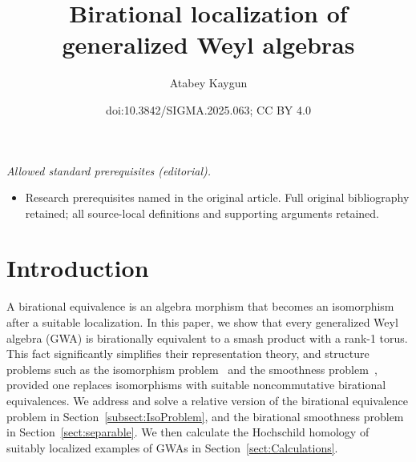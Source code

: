 \documentclass[10pt,a4paper]{amsart}
\title{Birational localization of generalized Weyl algebras}
\author{Atabey Kaygun}
\date{doi:10.3842/SIGMA.2025.063; CC BY 4.0}
\numberwithin{equation}{section}
\begin{document}
\maketitle
\noindent\textit{Allowed standard prerequisites (editorial).}\begin{itemize}
\item Research prerequisites named in the original article. Full original bibliography retained; all source-local definitions and supporting arguments retained.
\end{itemize}\medskip
\section{Introduction}

A birational equivalence is an algebra morphism that becomes an isomorphism after a suitable
localization. In this paper, we show that every generalized Weyl algebra (GWA) is birationally
equivalent to a smash product with a rank-1 torus. This fact significantly simplifies their
representation theory, and structure problems such as the isomorphism
problem~\cite{BavulaJordan:IsoProblem,Hodges:NCDeformations, RichardSolotar:IsoProblem,
 AlvarezVivaz:IsomorphismsOfQGWAs, Tang:IsoProblem} and the smoothness
problem~\cite{Bavula:GlobalDim, Hodges:NCDeformations,
 Liu:HomologicalSmoothnessI,Liu:HomologicalSmoothnessII, SolotarAlvarezVivas:QuantumGeneralizedWeyl}, provided one replaces isomorphisms with
suitable noncommutative birational equivalences. We address and solve a relative version of the
birational equivalence problem in Section~\ref{subsect:IsoProblem}, and the birational smoothness
problem in Section~\ref{sect:separable}. We then calculate the Hochschild homology of suitably
localized examples of GWAs in Section~\ref{sect:Calculations}.
\end{document}
